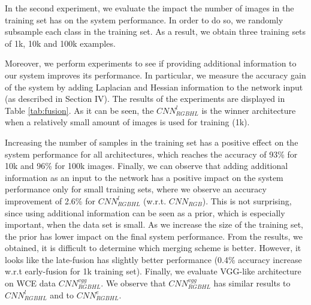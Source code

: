 \documentclass[review,12pt,3p]{elsarticle}
\begin{document}
\begin{table}[!ht]
\centering
{}
\caption{Confusion matrix for our method $CNN_{RGB}$. The numbers represent percentages.}
\label{tab:resCNN}
\end{table}

In the second experiment, we evaluate the impact the number of images in the training set has on the system performance. In order to do so, we randomly subsample each class in the training set. As a result, we obtain three training sets of 1k, 10k and 100k examples.

Moreover, we perform experiments to see if providing additional information to our system improves its performance. In particular, we measure the accuracy gain of the system by adding Laplacian and Hessian information to the network input (as described in Section IV). The results of the experiments are displayed in Table \ref{tab:fusion}. As it can be seen, the $CNN^l_{RGBHL}$ is the winner architecture when a relatively small amount of images is used for training (1k).

Increasing the number of samples in the training set has a positive effect on the system performance for all architectures, which reaches the accuracy of 93\% for 10k and 96\% for 100k images. Finally, we can observe that adding additional information as an input to the network has a positive impact on the system performance only for small training sets, where we observe an accuracy improvement of 2.6\% for $CNN^l_{RGBHL}$ (w.r.t. $CNN_{RGB}$). This is not surprising, since using additional information can be seen as a prior, which is especially important, when the data set is small. As we increase the size of the training set, the prior has lower impact on the final system performance. From the results, we obtained, it is difficult to determine which merging scheme is better. However, it looks like the late-fusion has slightly better performance (0.4\% accuracy increase w.r.t early-fusion for 1k training set). Finally, we evaluate VGG-like architecture on WCE data $CNN^{vgg}_{RGBHL}$. We observe that $CNN^{vgg}_{RGBHL}$ has similar results to $CNN^l_{RGBHL}$ and to $CNN^e_{RGBHL}$.
\end{document}
